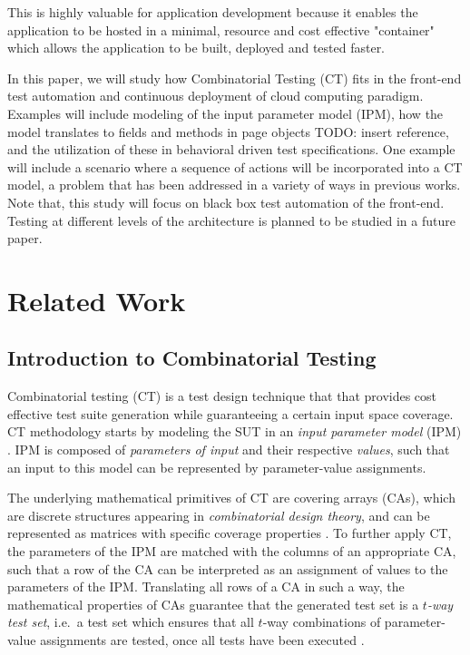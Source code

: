 \documentclass[conference]{IEEEtran}
\newcommand{\todo}[1]{}
\renewcommand{\todo}[1]{{\color{red} TODO: {#1}}}
\begin{document}
This is highly valuable for application development because it enables the application to be hosted in a minimal, resource and cost effective "container" which 
allows the application to be built, deployed and tested faster.

In this paper, we will study how Combinatorial Testing (CT) fits in the front-end test automation and continuous deployment of cloud computing paradigm.
Examples will include modeling of the input parameter model (IPM), how the model translates to fields and methods in page objects \todo{insert reference}, 
and the utilization of these in behavioral driven test specifications.
One example will include a scenario where a sequence of actions will be incorporated into a CT model, a problem that has been addressed in a variety of ways in previous works.
Note that, this study will focus on black box test automation of the front-end. Testing at different levels of the architecture is planned to be studied in a future paper. 

\section{Related Work}

	\subsection{Introduction to Combinatorial Testing}
	Combinatorial testing (CT) is a test design technique that that provides cost effective test suite generation
	while guaranteeing a certain input space coverage.
	CT methodology starts by modeling the SUT in an \emph{input parameter model} (IPM) \cite{OffuttIPM}.
	IPM is composed of \emph{parameters of input} and their respective \emph{values},
	such that an input to this model can be represented by parameter-value assignments.
	
	The underlying mathematical primitives of CT are covering arrays (CAs), which are discrete structures appearing in \emph{combinatorial design theory},
	and can be represented as matrices with specific coverage properties \cite{NISTpractical}.
	To further apply CT, the parameters of the IPM are matched with the columns of an appropriate CA,
	such that a row of the CA can be interpreted as an assignment of values to the parameters of the IPM.
	Translating all rows of a CA in such a way, the mathematical properties of CAs guarantee that the generated test set
	is a \emph{$t$-way test set}, i.e.\ a test set which ensures that all $t$-way combinations of parameter-value assignments are tested,
	once all tests have been executed \cite{NISTpractical}.
	
\end{document}

